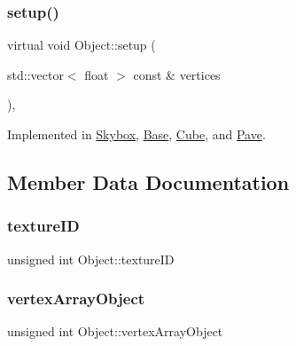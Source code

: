 \subsubsection{\texorpdfstring{setup()}{setup()}}
{\footnotesize\ttfamily virtual void Object\+::setup (\begin{DoxyParamCaption}\item[{std\+::vector$<$ float $>$ const \&}]{vertices }\end{DoxyParamCaption})\hspace{0.3cm}{\ttfamily [protected]}, {}}



Implemented in \hyperlink{classSkybox_a3f99748c514edd99809a6977f354702f}{Skybox}, \hyperlink{classBase_a57945f86e82faccbd6147f355ed17407}{Base}, \hyperlink{classCube_a107c29684289fcd3be2b1da6d297fe23}{Cube}, and \hyperlink{classPave_a1e3cc420288e7e704891cdfc2cada962}{Pave}.



\subsection{Member Data Documentation}
\mbox{\label{classObject_a7ed4c3e30bec9ca76a7e820c5d3fdb6d}} 
\subsubsection{\texorpdfstring{texture\+ID}{textureID}}
{\footnotesize\ttfamily unsigned int Object\+::texture\+ID\hspace{0.3cm}{\ttfamily [protected]}}

\mbox{\label{classObject_abb132c1ff3bc3c4115f7c48c43f67474}} 
\subsubsection{\texorpdfstring{vertex\+Array\+Object}{vertexArrayObject}}
{\footnotesize\ttfamily unsigned int Object\+::vertex\+Array\+Object\hspace{0.3cm}{\ttfamily [protected]}}

\mbox{\label{classObject_a2eeb21fc71ed8449cf61d36d99cb0257}} 
